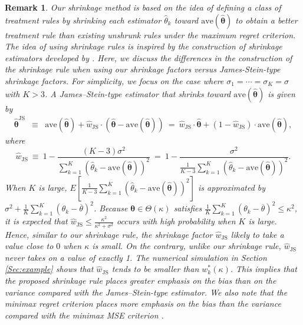 \documentclass[12pt,a4paper]{article}
\newtheorem{Remark}{Remark}
\begin{document}
\begin{Remark}\label{rem:shrinkage_est}
Our shrinkage method is based on the idea of defining a class of treatment rules by shrinking each estimator $\hat{\theta}_k$ toward $\mathrm{ave} (\hat{\bm{\theta}})$ to obtain a better treatment rule than existing unshrunk rules under the maximum regret criterion. The idea of using shrinkage rules is inspired by the construction of shrinkage estimators developed by \cite{JaSt61}. Here, we discuss the differences in the construction of the shrinkage rule when using our shrinkage factors versus James-Stein-type shrinkage factors. For simplicity, we focus on the case where $\sigma_1 = \cdots = \sigma_K = \sigma$ with $K > 3$. A James–Stein-type estimator that shrinks toward $\mathrm{ave} (\hat{\bm{\theta}})$ is given by
\begin{eqnarray}
    \hat{\bm{\theta}}^{\mathrm{JS}} & \equiv & \mathrm{ave} (\hat{\bm{\theta}}) + \hat{w}_{\mathrm{JS}} \cdot \left( \hat{\bm{\theta}} - \mathrm{ave} (\hat{\bm{\theta}}) \right) \ = \ \hat{w}_{\mathrm{JS}} \cdot \hat{\bm{\theta}} + (1-\hat{w}_{\mathrm{JS}}) \cdot \mathrm{ave} (\hat{\bm{\theta}}), \label{JS-estimator}
\end{eqnarray}
where
\[
\hat{w}_{\mathrm{JS}} \ \equiv \ 1 - \frac{(K-3) \sigma^2}{\sum_{k=1}^K \left( \hat{\theta}_k - \mathrm{ave}(\hat{\bm{\theta}}) \right)^2} \ = \ 1 - \frac{\sigma^2}{\frac{1}{K-3} \sum_{k=1}^K \left( \hat{\theta}_k - \mathrm{ave}(\hat{\bm{\theta}}) \right)^2}.
\]
When $K$ is large, $E \left[ \frac{1}{K-3} \sum_{k=1}^K \left( \hat{\theta}_k - \mathrm{ave}(\hat{\bm{\theta}}) \right)^2 \right]$ is approximated by $\sigma^2 + \frac{1}{K}\sum_{k=1}^K (\theta_k - \overline{\theta})^2$. Because $\bm{\theta} \in \Theta(\kappa)$ satisfies $\frac{1}{K}\sum_{k=1}^K (\theta_k - \overline{\theta})^2 \leq \kappa^2$, it is expected that $\hat{w}_{\mathrm{JS}} \leq \frac{\kappa^2}{\kappa^2 + \sigma^2}$ occurs with high probability when $K$ is large. Hence, similar to our shrinkage rule, the shrinkage factor $\hat{w}_{\mathrm{JS}}$ likely to take a value close to $0$ when $\kappa$ is small. On the contrary, unlike our shrinkage rule, $\hat{w}_{\mathrm{JS}}$ never takes on a value of exactly 1. The numerical simulation in Section \ref{Sec:example} shows that $\hat{w}_{\mathrm{JS}}$ tends to be smaller than $w_k^{\ast}(\kappa)$. This implies that the proposed shrinkage rule places greater emphasis on the bias than on the variance compared with the James–Stein-type estimator. We also note that the minimax regret criterion places more emphasis on the bias than the variance compared with the minimax MSE criterion \citep{ishihara2021evidence}.
\end{Remark}
\end{document}
